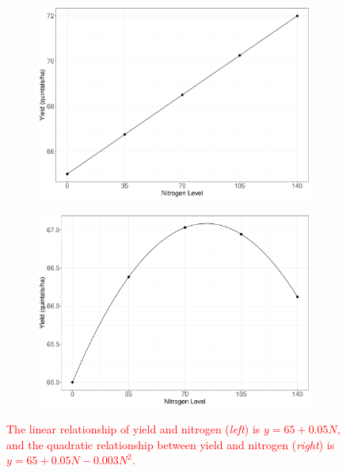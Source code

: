 \documentclass[a4paper]{article} 	%
\newcommand{\revision}[1]{\textcolor{red}{#1}}
\begin{document}
\begin{figure}[!htp]
	\begin{subfigure}[t]{0.45\textwidth}
		\centering
		\includegraphics[width=\linewidth]{Expt/LinlinesV2.pdf}
        \end{subfigure}
	\hspace{0.05\textwidth}
	\begin{subfigure}[t]{0.45\textwidth}
		\centering
		\includegraphics[width=\linewidth]{Expt/QualinesV2.pdf}
        \end{subfigure}
	\caption{\revision{The linear relationship of yield and nitrogen (\textit{left}) is $y=65+0.05N$, and the quadratic relationship between yield and nitrogen (\textit{right}) is $y=65+0.05N-0.003N^2$.}}\label{fig:Lines}
\end{figure}
\end{document}
